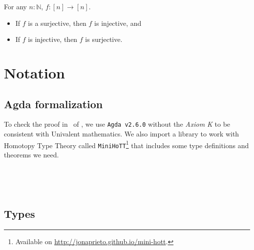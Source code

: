 \documentclass[11pt, a4paper, oneside]{amsart}
\begin{document}
For any $n : ℕ$, $f : [n] \to [n]$.
\begin{itemize}
\item If $f$ is a surjective, then $f$ is injective, and
\item If $f$ is injective, then $f$ is surjective.
\end{itemize}

\section{Notation}

\subsection{Agda formalization}

To check the proof in~ of , we
use \texttt{Agda v2.6.0} without the \emph{Axiom K} to be consistent with
Univalent mathematics. We also import a library to work with Homotopy Type
Theory called \texttt{MiniHoTT}\footnote{Available on
\url{http://jonaprieto.github.io/mini-hott}.} that includes some type
definitions and theorems we need.

\begin{code}%
\>[0]\AgdaSymbol{\{-\#}\AgdaSpace{}%
\AgdaSpace{}%
%
\>[25]\AgdaSymbol{\#-\}}\<%
\\
\>[0]\AgdaSpace{}%
\AgdaSpace{}%
\<%
\end{code}

\begin{code}[hide]%
\>[0]\AgdaSpace{}%
\AgdaModule{\AgdaUnderscore{}}\AgdaSpace{}%
\AgdaSymbol{\{}\AgdaSpace{}%
\AgdaSymbol{:}\AgdaSpace{}%
\AgdaSymbol{\}}\AgdaSpace{}%
\<%
\\
\>[0][@{}l@{\AgdaIndent{0}}]%
\>[2]\AgdaSpace{}%
\AgdaSpace{}%
\<%
\end{code}

\subsection{Types}
\end{document}

